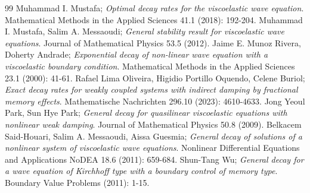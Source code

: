 \documentclass[10pt,a4paper]{amsart}
\numberwithin{equation}{section}
\begin{document}
\begin{thebibliography}{99}
 Muhammad I. Mustafa; \emph{Optimal decay rates for the viscoelastic wave equation}. Mathematical Methods in the Applied Sciences 41.1 (2018): 192-204.
 Muhammad I. Mustafa, Salim A. Messaoudi; \emph{General stability result for viscoelastic wave equations}. Journal of Mathematical Physics 53.5 (2012).
 Jaime E. Munoz Rivera, Doherty Andrade; \emph{Exponential decay of non-linear wave equation with a viscoelastic boundary condition}. Mathematical Methods in the Applied Sciences 23.1 (2000): 41-61.
 Rafael Lima Oliveira, Higidio Portillo Oquendo, Celene Buriol; \emph{Exact decay rates for weakly coupled systems with indirect damping by fractional memory effects}. Mathematische Nachrichten 296.10 (2023): 4610-4633.
 Jong Yeoul Park, Sun Hye Park; \emph{General decay for quasilinear viscoelastic equations with nonlinear weak damping}. Journal of Mathematical Physics 50.8 (2009).
 Belkacem Said-Houari, Salim A. Messaoudi, Aissa Guesmia; \emph{General decay of solutions of a nonlinear system of viscoelastic wave equations}. Nonlinear Differential Equations and Applications NoDEA 18.6 (2011): 659-684.
 Shun-Tang Wu; \emph{General decay for a wave equation of Kirchhoff type with a boundary control of memory type}. Boundary Value Problems (2011): 1-15.
\end{thebibliography}
\end{document}

